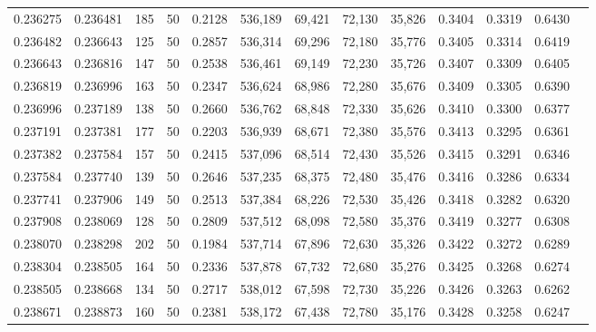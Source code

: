 \begin{tabular}{rrrrrrrrrrrrr}
0.236275 & 0.236481 &   185 &  50 &                                     0.2128 & 536,189 &  69,421 &  72,130 &  35,826 & 0.3404 & 0.3319 & 0.6430 \\
0.236482 & 0.236643 &   125 &  50 &                                     0.2857 & 536,314 &  69,296 &  72,180 &  35,776 & 0.3405 & 0.3314 & 0.6419 \\
0.236643 & 0.236816 &   147 &  50 &                                     0.2538 & 536,461 &  69,149 &  72,230 &  35,726 & 0.3407 & 0.3309 & 0.6405 \\
0.236819 & 0.236996 &   163 &  50 &                                     0.2347 & 536,624 &  68,986 &  72,280 &  35,676 & 0.3409 & 0.3305 & 0.6390 \\
0.236996 & 0.237189 &   138 &  50 &                                     0.2660 & 536,762 &  68,848 &  72,330 &  35,626 & 0.3410 & 0.3300 & 0.6377 \\
0.237191 & 0.237381 &   177 &  50 &                                     0.2203 & 536,939 &  68,671 &  72,380 &  35,576 & 0.3413 & 0.3295 & 0.6361 \\
0.237382 & 0.237584 &   157 &  50 &                                     0.2415 & 537,096 &  68,514 &  72,430 &  35,526 & 0.3415 & 0.3291 & 0.6346 \\
0.237584 & 0.237740 &   139 &  50 &                                     0.2646 & 537,235 &  68,375 &  72,480 &  35,476 & 0.3416 & 0.3286 & 0.6334 \\
0.237741 & 0.237906 &   149 &  50 &                                     0.2513 & 537,384 &  68,226 &  72,530 &  35,426 & 0.3418 & 0.3282 & 0.6320 \\
0.237908 & 0.238069 &   128 &  50 &                                     0.2809 & 537,512 &  68,098 &  72,580 &  35,376 & 0.3419 & 0.3277 & 0.6308 \\
0.238070 & 0.238298 &   202 &  50 &                                     0.1984 & 537,714 &  67,896 &  72,630 &  35,326 & 0.3422 & 0.3272 & 0.6289 \\
0.238304 & 0.238505 &   164 &  50 &                                     0.2336 & 537,878 &  67,732 &  72,680 &  35,276 & 0.3425 & 0.3268 & 0.6274 \\
0.238505 & 0.238668 &   134 &  50 &                                     0.2717 & 538,012 &  67,598 &  72,730 &  35,226 & 0.3426 & 0.3263 & 0.6262 \\
0.238671 & 0.238873 &   160 &  50 &                                     0.2381 & 538,172 &  67,438 &  72,780 &  35,176 & 0.3428 & 0.3258 & 0.6247 \\

\end{tabular}
